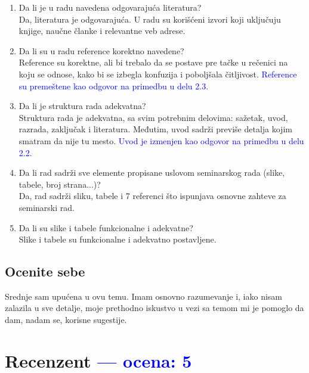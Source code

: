 \documentclass[a4paper]{report}
\newcommand{\odgovor}[1]{\textcolor{blue}{#1}}
\begin{document}
\begin{enumerate}
\item Da li je u radu navedena odgovarajuća literatura?\\
Da, literatura je odgovarajuća. U radu su korišćeni izvori koji uključuju knjige, naučne članke i relevantne veb adrese.

\item Da li su u radu reference korektno navedene?\\
Reference su korektne, ali bi trebalo da se postave pre tačke u rečenici na koju se odnose, kako bi se izbegla konfuzija i poboljšala čitljivost. \odgovor{Reference su premeštene kao odgovor na primedbu u delu 2.3.}

\item Da li je struktura rada adekvatna?\\
Struktura rada je adekvatna, sa svim potrebnim delovima: sažetak, uvod, razrada, zaključak i literatura. Međutim, uvod sadrži previše detalja kojim smatram da nije tu mesto. \odgovor{Uvod je izmenjen kao odgovor na primedbu u delu 2.2. }

\item Da li rad sadrži sve elemente propisane uslovom seminarskog rada (slike, tabele, broj strana...)?\\
Da, rad sadrži sliku, tabele i 7 referenci što ispunjava osnovne zahteve za seminarski rad.

\item Da li su slike i tabele funkcionalne i adekvatne?\\
Slike i tabele su funkcionalne i adekvatno postavljene.

\end{enumerate}

\section{Ocenite sebe}

Srednje sam upućena u ovu temu. Imam osnovno razumevanje i, iako nisam zalazila u sve detalje, moje prethodno iskustvo u vezi sa temom mi je pomoglo da dam, nadam se, korisne sugestije.


\chapter{Recenzent \odgovor{--- ocena: 5} }
\end{document}
